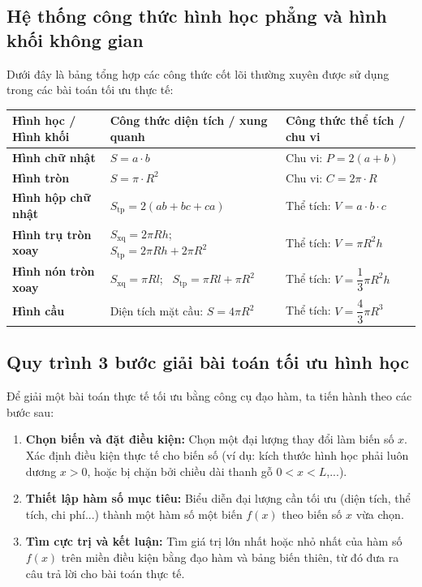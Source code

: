 \documentclass[12pt]{article}
\begin{document}
	\subsection{Hệ thống công thức hình học phẳng và hình khối không gian}
	Dưới đây là bảng tổng hợp các công thức cốt lõi thường xuyên được sử dụng trong các bài toán tối ưu thực tế:
	
	\begin{center}
		\small
		\renewcommand{\arraystretch}{1.5}
		\begin{tabular}{p{4.2cm} p{5.5cm} p{5.5cm}}
			\toprule
			\textbf{Hình học / Hình khối} & \textbf{Công thức diện tích / xung quanh} & \textbf{Công thức thể tích / chu vi} \\
			\midrule
			\textbf{Hình chữ nhật} & $S = a \cdot b$ & Chu vi: $P = 2(a + b)$ \\
			\textbf{Hình tròn} & $S = \pi \cdot R^2$ & Chu vi: $C = 2\pi \cdot R$ \\
			\textbf{Hình hộp chữ nhật} & $S_{\text{tp}} = 2(ab + bc + ca)$ & Thể tích: $V = a \cdot b \cdot c$ \\
			\textbf{Hình trụ tròn xoay} & $S_{\text{xq}} = 2\pi R h$; \ $S_{\text{tp}} = 2\pi R h + 2\pi R^2$ & Thể tích: $V = \pi R^2 h$ \\
			\textbf{Hình nón tròn xoay} & $S_{\text{xq}} = \pi R l$; \ $S_{\text{tp}} = \pi R l + \pi R^2$ & Thể tích: $V = \dfrac{1}{3}\pi R^2 h$ \\
			\textbf{Hình cầu} & Diện tích mặt cầu: $S = 4\pi R^2$ & Thể tích: $V = \dfrac{4}{3}\pi R^3$ \\
			\bottomrule
		\end{tabular}
	\end{center}
	
	\subsection{Quy trình 3 bước giải bài toán tối ưu hình học}
	Để giải một bài toán thực tế tối ưu bằng công cụ đạo hàm, ta tiến hành theo các bước sau:
	\begin{enumerate}[label=\textbf{Bước \arabic*:}, leftmargin=*]
		\item \textbf{Chọn biến và đặt điều kiện:} Chọn một đại lượng thay đổi làm biến số $x$. Xác định điều kiện thực tế cho biến số (ví dụ: kích thước hình học phải luôn dương $x > 0$, hoặc bị chặn bởi chiều dài thanh gỗ $0 < x < L$,...).
		\item \textbf{Thiết lập hàm số mục tiêu:} Biểu diễn đại lượng cần tối ưu (diện tích, thể tích, chi phí...) thành một hàm số một biến $f(x)$ theo biến số $x$ vừa chọn.
		\item \textbf{Tìm cực trị và kết luận:} Tìm giá trị lớn nhất hoặc nhỏ nhất của hàm số $f(x)$ trên miền điều kiện bằng đạo hàm và bảng biến thiên, từ đó đưa ra câu trả lời cho bài toán thực tế.
	\end{enumerate}
	
\end{document}
